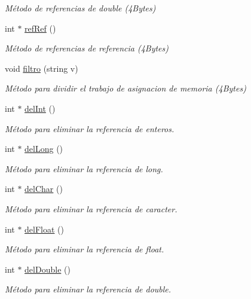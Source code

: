 \begin{DoxyCompactItemize}
\begin{DoxyCompactList}\small\item\em Método de referencias de double (4\+Bytes) \end{DoxyCompactList}\item 
int $\ast$ \hyperlink{classmemoria_a871dcd6dc6797e2eb21f3d61cf004834}{ref\+Ref} ()
\begin{DoxyCompactList}\small\item\em Método de referencias de referencia (4\+Bytes) \end{DoxyCompactList}\item 
void \hyperlink{classmemoria_a292204ed5deabb29ae7a1df754ed4a3d}{filtro} (string v)
\begin{DoxyCompactList}\small\item\em Método para dividir el trabajo de asignacion de memoria (4\+Bytes) \end{DoxyCompactList}\item 
int $\ast$ \hyperlink{classmemoria_a4e32adde1fd3538696c665eee1d2fce0}{del\+Int} ()
\begin{DoxyCompactList}\small\item\em Método para eliminar la referencia de enteros. \end{DoxyCompactList}\item 
int $\ast$ \hyperlink{classmemoria_ab502a98e209de50f8ab945c8e3bb05ed}{del\+Long} ()
\begin{DoxyCompactList}\small\item\em Método para eliminar la referencia de long. \end{DoxyCompactList}\item 
int $\ast$ \hyperlink{classmemoria_ab5e5ae2869630f9749a273c1c2870ca9}{del\+Char} ()
\begin{DoxyCompactList}\small\item\em Método para eliminar la referencia de caracter. \end{DoxyCompactList}\item 
int $\ast$ \hyperlink{classmemoria_a7686101836edd84ca1c0781034eaf5d1}{del\+Float} ()
\begin{DoxyCompactList}\small\item\em Método para eliminar la referencia de float. \end{DoxyCompactList}\item 
int $\ast$ \hyperlink{classmemoria_a5b2d31463100abb7dfc9ec175ff16c2a}{del\+Double} ()
\begin{DoxyCompactList}\small\item\em Método para eliminar la referencia de double. \end{DoxyCompactList}\item 

\end{DoxyCompactItemize}
